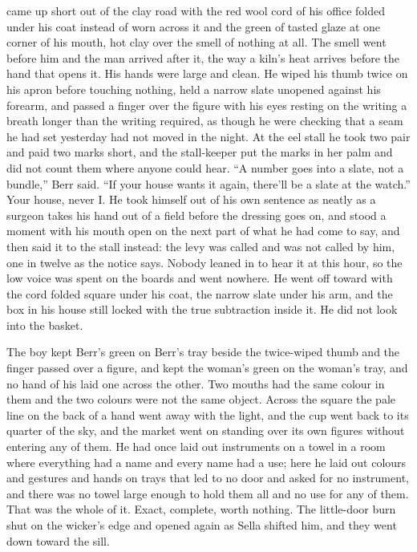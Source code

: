  came up short out of the clay road with the red wool cord of his office folded under his coat instead of worn across it and the green of tasted glaze at one corner of his mouth, hot clay over the smell of nothing at all. The smell went before him and the man arrived after it, the way a kiln's heat arrives before the hand that opens it. His hands were large and clean. He wiped his thumb twice on his apron before touching nothing, held a narrow slate unopened against his forearm, and passed a finger over the figure with his eyes resting on the writing a breath longer than the writing required, as though he were checking that a seam he had set yesterday had not moved in the night. At the eel stall he took two pair and paid two marks short, and the stall-keeper put the marks in her palm and did not count them where anyone could hear. “A number goes into a slate, not a bundle,” Berr said. “If your house wants it again, there'll be a slate at the watch.” Your house, never I. He took himself out of his own sentence as neatly as a surgeon takes his hand out of a field before the dressing goes on, and stood a moment with his mouth open on the next part of what he had come to say, and then said it to the stall instead: the levy was called and was not called by him, one in twelve as the notice says. Nobody leaned in to hear it at this hour, so the low voice was spent on the boards and went nowhere. He went off toward  with the cord folded square under his coat, the narrow slate under his arm, and the box in his house still locked with the true subtraction inside it. He did not look into the basket.

The boy kept Berr's green on Berr's tray beside the twice-wiped thumb and the finger passed over a figure, and kept the woman's green on the woman's tray, and no hand of his laid one across the other. Two mouths had the same colour in them and the two colours were not the same object. Across the square the pale line on the back of a hand went away with the light, and the cup went back to its quarter of the sky, and the market went on standing over its own figures without entering any of them. He had once laid out instruments on a towel in a room where everything had a name and every name had a use; here he laid out colours and gestures and hands on trays that led to no door and asked for no instrument, and there was no towel large enough to hold them all and no use for any of them. That was the whole of it. Exact, complete, worth nothing. The little-door burn shut on the wicker's edge and opened again as Sella shifted him, and they went down toward the sill.


